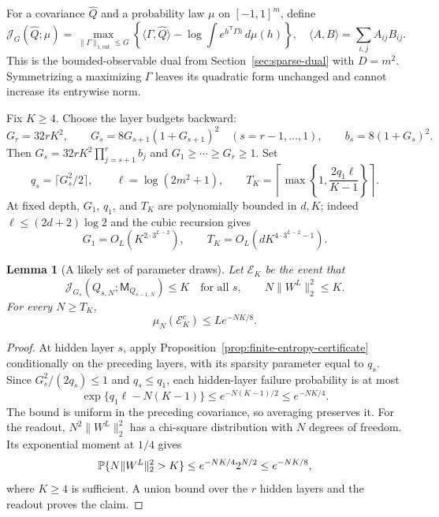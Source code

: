 \documentclass[11pt]{article}
\newtheorem{lemma}[theorem]{Lemma}\newtheorem{corollary}[theorem]{Corollary}
\theoremstyle{remark}\newtheorem{remark}[theorem]{Remark}
\begin{document}
For a covariance $\widehat Q$ and a probability law $\mu$ on
$[-1,1]^m$, define
\[
 \mathcal J_G(\widehat Q;\mu)=
 \max_{\|\Gamma\|_{1,\mathrm{ent}}\leq G}
 \left\{\langle\Gamma,\widehat Q\rangle
       -\log\int e^{h^{\mathsf T}\Gamma h}\,d\mu(h)\right\},
 \quad \langle A,B\rangle=\sum_{i,j}A_{ij}B_{ij}.
\]
This is the bounded-observable dual from Section~\ref{sec:sparse-dual}
with $D=m^2$. Symmetrizing a maximizing $\Gamma$ leaves its quadratic
form unchanged and cannot increase its entrywise norm.

Fix $K\geq4$. Choose the layer budgets backward:
\begin{equation}\label{eq:backwards-budgets}
 G_r=32rK^2,\qquad
 G_s=8G_{s+1}(1+G_{s+1})^2\quad(s=r-1,\ldots,1),
 \qquad b_s=8(1+G_s)^2.
\end{equation}
Then $G_s=32rK^2\prod_{j=s+1}^r b_j$ and
$G_1\geq\cdots\geq G_r\geq1$.
Set
\begin{equation}\label{eq:polynomial-threshold}
 q_s=\lceil G_s^2/2\rceil,
 \qquad \ell=\log(2m^2+1),
 \qquad T_K=\left\lceil\max\left\{1,\frac{2q_1\ell}{K-1}\right\}\right\rceil.
\end{equation}
At fixed depth, $G_1$, $q_1$, and $T_K$ are polynomially bounded in $d,K$;
indeed $\ell\leq(2d+2)\log2$ and the cubic recursion gives
\[
 G_1=O_L(K^{2\cdot3^{L-2}}),\qquad
 T_K=O_L(dK^{4\cdot3^{L-2}-1}).
\]

\begin{lemma}[A likely set of parameter draws]\label{lem:good-event}
Let $\mathcal E_K$ be the event that
\[
 \mathcal J_{G_s}(Q_{s,N};\mathsf M_{Q_{s-1,N}})\leq K
 \quad\text{for all }s,
 \qquad N\|W^L\|_2^2\leq K.
\]
For every $N\geq T_K$,
\begin{equation}\label{eq:good-event-tail}
 \mu_N(\mathcal E_K^c)\leq L e^{-NK/8}.
\end{equation}
\end{lemma}
\begin{proof}
At hidden layer $s$, apply Proposition~\ref{prop:finite-entropy-certificate}
conditionally on the preceding layers, with its sparsity parameter equal to
$q_s$. Since
$G_s^2/(2q_s)\leq1$ and $q_s\leq q_1$, each hidden-layer failure
probability is at most
\[
 \exp\{q_1\ell-N(K-1)\}
 \leq e^{-N(K-1)/2}\leq e^{-NK/4}.
\]
The bound is uniform in the preceding covariance, so averaging preserves it.
For the readout, $N^2\|W^L\|_2^2$ has a chi-square distribution with
$N$ degrees of freedom. Its exponential moment at $1/4$ gives
\[
 \mathbb P\{N\|W^L\|_2^2>K\}
 \leq e^{-NK/4}2^{N/2}\leq e^{-NK/8},
\]
where $K\geq4$ is sufficient. A union bound over the $r$ hidden layers
and the readout proves the claim.
\end{proof}
\end{document}
